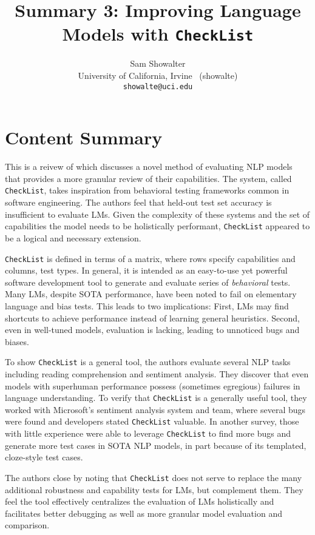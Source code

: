 \documentclass[11pt,a4paper]{article}
\title{Summary 3: Improving Language Models with \texttt{CheckList} }
\author{Sam Showalter \\
  University of California, Irvine \ (showalte) \\  
\texttt{showalte@uci.edu}}
\date{}
\begin{document}
\maketitle

\section{Content Summary}
\label{sec:content_summary}
This is a reivew of \cite{checklist:acl20} which discusses a novel method of 
evaluating NLP models that provides a more granular review of their capabilities. The system,
called \texttt{CheckList}, takes inspiration from behavioral testing frameworks common in 
software engineering. The authors feel that held-out test set
accuracy is insufficient to evaluate LMs. Given the complexity of these systems and the set of
capabilities the model needs to be holistically performant, \texttt{CheckList} appeared to be a
logical and necessary extension.

\texttt{CheckList} is defined in terms of a matrix, where rows specify capabilities and columns, 
test types. In general, it is intended as an easy-to-use yet powerful software development tool to 
generate and evaluate series of \textit{behavioral} tests. Many LMs, despite SOTA performance, have been
noted to fail on elementary language and bias tests. This leads to two implications:
First, LMs may find shortcuts to achieve performance instead of learning general heuristics.
Second, even in well-tuned models, evaluation is lacking, leading to unnoticed bugs and biases.

To show \texttt{CheckList} is a general tool, the authors evaluate several NLP tasks including reading 
comprehension and sentiment analysis. They discover that even models with superhuman performance possess (sometimes 
egregious) failures in language understanding.
To verify that \texttt{CheckList} is a generally useful tool, they worked with Microsoft's sentiment analysis system
and team, where several bugs were found and developers stated \texttt{CheckList} valuable. In another survey, those with
little experience were able to leverage \texttt{CheckList} to find more bugs and generate more test cases in 
SOTA NLP models, in part because of its templated, cloze-style test cases.

The authors close by noting that \texttt{CheckList} does not serve to replace the many additional robustness and capability
tests for LMs, but complement them. They feel the tool effectively centralizes the evaluation of LMs holistically and 
facilitates better debugging as well as more granular model evaluation and comparison.
\end{document}
